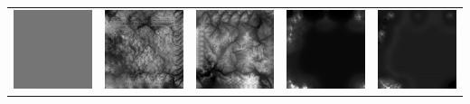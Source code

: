 \documentclass[twocolumn]{article}
\begin{document}
\begin{table}[t]
\begin{tabular}{c|c|c|c|c}
 				\includegraphics[width=0.25\columnwidth]{70.png} & \includegraphics[width=0.25\columnwidth]{71.png} & \includegraphics[width=0.25\columnwidth]{72.png} & \includegraphics[width=0.25\columnwidth]{73.png} & \includegraphics[width=0.25\columnwidth]{74.png} \\

\end{tabular}
\end{table}
\end{document}
